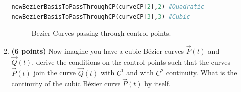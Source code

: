 \documentclass[a4paper, 11pt]{article}
\begin{document}
\begin{enumerate}
\begin{enumerate}[label=\alph*.]
\begin{lstlisting}[language=Python]
newBezierBasisToPassThroughCP(curveCP[2],2) #Quadratic
newBezierBasisToPassThroughCP(curveCP[3],3) #Cubic
\end{lstlisting} 
    \begin{figure}[ht] 
 \quad 
  \caption{Bezier Curves passing through control points.} 
  \label{fig:bezierCurvesCP}
\end{figure}
    \item \textbf{(6 points)} Now imagine you have a cubic B\'{e}zier curves $\vec P(t)$ and $\vec Q(t)$, derive the conditions on the control points such that the curves $\vec P(t)$ join the curve $\vec Q(t)$ with $C^1$ and with $C^2$ continuity. What is the continuity of the cubic B\'{e}zier curve $\vec P(t)$ by itself.

\end{enumerate}
\end{enumerate}
\end{document}

